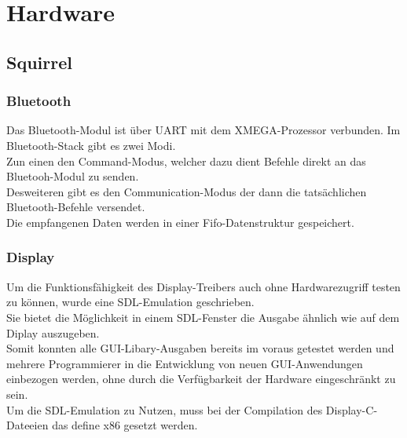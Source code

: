 \documentclass[12pt,a4paper]{article}
\begin{document}
\section{Hardware}
	\subsection{Squirrel}
	\subsubsection{Bluetooth}
Das Bluetooth-Modul ist über UART mit dem XMEGA-Prozessor verbunden. Im Bluetooth-Stack gibt es zwei Modi. \\
Zun einen den Command-Modus, welcher dazu dient Befehle direkt an das Bluetooh-Modul zu senden.\\
Desweiteren gibt es den Communication-Modus der dann die tatsächlichen Bluetooth-Befehle versendet.\\
Die empfangenen Daten werden in einer Fifo-Datenstruktur gespeichert.\\


\subsubsection{Display}
Um die Funktionsfähigkeit des Display-Treibers auch ohne Hardwarezugriff testen zu können, wurde eine SDL-Emulation geschrieben.\\
Sie bietet die Möglichkeit in einem SDL-Fenster die Ausgabe ähnlich wie auf dem Diplay auszugeben.\\
Somit konnten alle GUI-Libary-Ausgaben bereits im voraus getestet werden und mehrere Programmierer in die Entwicklung von neuen GUI-Anwendungen einbezogen werden, ohne durch die Verfügbarkeit der Hardware eingeschränkt zu sein.\\
Um die SDL-Emulation zu Nutzen, muss bei der Compilation des Display-C-Dateeien das define x86 gesetzt werden.\\
\end{document}
